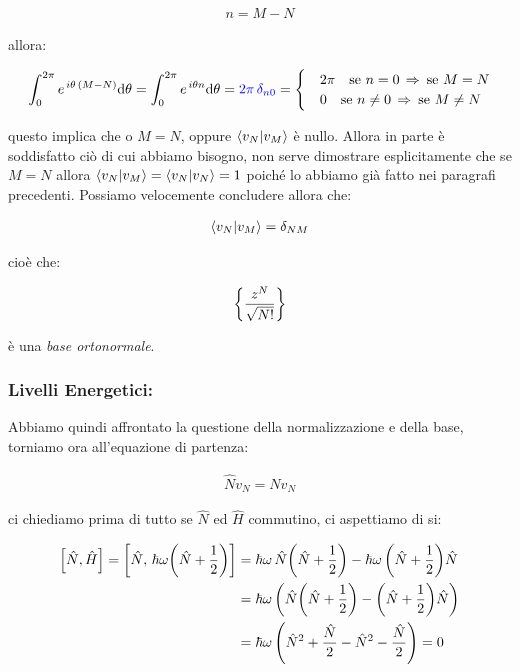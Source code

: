 \begin{myprf}
\begin{align*}
	n = M -N 
\end{align*}

	allora:

\begin{align*}
	\int_{0}^{2\pi}e^{\,i\theta\, \qty(M-N) }  \dd \theta  = \int_{0}^{2\pi}e^{\,i\theta n}  \dd \theta = \textcolor{blue}{2\pi \, \delta_{n0} }= \begin{cases}
		& 2\pi \quad \text{se $n =0 \, \Rightarrow \, $ se $M = N$} \\
		& 0 \quad \text{se $n \neq 0 \, \Rightarrow \, $ se $M \neq N$}
	\end{cases}
\end{align*}

	questo implica che o $M = N$, oppure $\braket{v_N}{v_M}$ è nullo. Allora in parte è soddisfatto ciò di cui abbiamo bisogno, non serve dimostrare esplicitamente che se $M = N$ allora $\braket{v_N}{v_M} = \braket{v_N} = 1$ poiché lo abbiamo già fatto nei paragrafi precedenti. Possiamo velocemente concludere allora che:
	
\begin{align*}
	\braket{v_N}{v_M} = \delta_{NM}
\end{align*}
	
	cioè che:
	
\begin{align*}
	\qty{\frac{z^N}{\sqrt{N!}}}
\end{align*}

	è una \textit{base ortonormale}.
	
\end{myprf}

\subsubsection{Livelli Energetici:}

	Abbiamo quindi affrontato la questione della normalizzazione e della base, torniamo ora all'equazione di partenza:
	
\begin{align*}
	\hat{N} v_N = N v_N
\end{align*}

	ci chiediamo prima di tutto se $\hat{N}$ ed $\hat{H} $ commutino, ci aspettiamo di si:

\begin{align*}
	\qty[\hat{N}, \hat{H}] = \qty[\hat{N}, \, \hbar \omega \qty(\hat{N} + \frac{1}{2})] & = \hbar \omega \, \hat{N} \qty(\hat{N} + \frac{1}{2} ) - \hbar \omega \, \qty(\hat{N} + \frac{1}{2} ) \hat{N} \\
	& = \hbar \omega \, \qty(  \hat{N} \qty(\hat{N} + \frac{1}{2} ) - \qty(\hat{N} + \frac{1}{2} ) \hat{N}) \\
	& = \hbar \omega \, \qty( \hat{N}^2 + \frac{\hat{N}}{2} - \hat{N}^2 -\frac{\hat{N}}{2} ) = 0
\end{align*}

